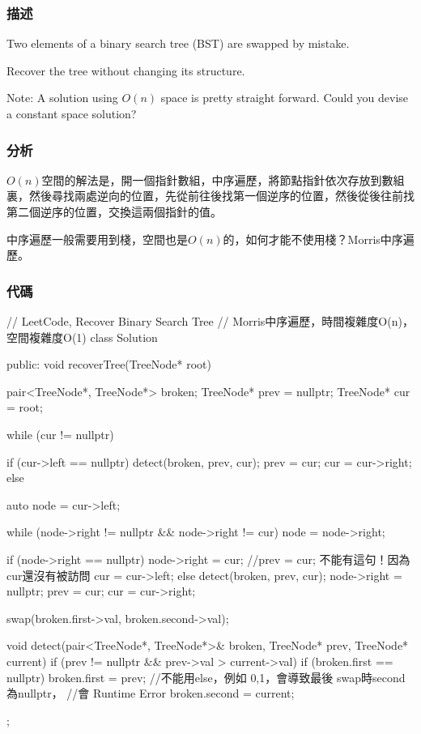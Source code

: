\subsubsection{描述}
Two elements of a binary search tree (BST) are swapped by mistake.

Recover the tree without changing its structure.

Note: A solution using $O(n)$ space is pretty straight forward. Could you devise a constant space solution?


\subsubsection{分析}
$O(n)$空間的解法是，開一個指針數組，中序遍歷，將節點指針依次存放到數組裏，然後尋找兩處逆向的位置，先從前往後找第一個逆序的位置，然後從後往前找第二個逆序的位置，交換這兩個指針的值。

中序遍歷一般需要用到棧，空間也是$O(n)$的，如何才能不使用棧？Morris中序遍歷。


\subsubsection{代碼}

\begin{Code}
// LeetCode, Recover Binary Search Tree
// Morris中序遍歷，時間複雜度O(n)，空間複雜度O(1)
class Solution {
public:
    void recoverTree(TreeNode* root) {
        pair<TreeNode*, TreeNode*> broken;
        TreeNode* prev = nullptr;
        TreeNode* cur = root;

        while (cur != nullptr) {
            if (cur->left == nullptr) {
                detect(broken, prev, cur);
                prev = cur;
                cur = cur->right;
            } else {
                auto node = cur->left;

                while (node->right != nullptr && node->right != cur)
                    node = node->right;

                if (node->right == nullptr) {
                    node->right = cur;
                    //prev = cur; 不能有這句！因為cur還沒有被訪問
                    cur = cur->left;
                } else {
                    detect(broken, prev, cur);
                    node->right = nullptr;
                    prev = cur;
                    cur = cur->right;
                }
            }
        }

        swap(broken.first->val, broken.second->val);
    }

    void detect(pair<TreeNode*, TreeNode*>& broken, TreeNode* prev,
            TreeNode* current) {
        if (prev != nullptr && prev->val > current->val) {
            if (broken.first == nullptr) {
                broken.first = prev;
            } //不能用else，例如 {0,1}，會導致最後 swap時second為nullptr，
              //會 Runtime Error
            broken.second = current;
        }
    }
};
\end{Code}


